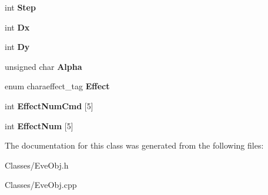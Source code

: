 \begin{DoxyCompactItemize}
\item 
int {\bfseries Step}\hypertarget{class_c_eve_obj_a80b342a74e5e71c12af93bd114950d59}{}\label{class_c_eve_obj_a80b342a74e5e71c12af93bd114950d59}

\item 
int {\bfseries Dx}\hypertarget{class_c_eve_obj_ac21fc500fe5980e297336a666fb54a7d}{}\label{class_c_eve_obj_ac21fc500fe5980e297336a666fb54a7d}

\item 
int {\bfseries Dy}\hypertarget{class_c_eve_obj_ae501f4202a2be1450d5559aacdc29cee}{}\label{class_c_eve_obj_ae501f4202a2be1450d5559aacdc29cee}

\item 
unsigned char {\bfseries Alpha}\hypertarget{class_c_eve_obj_af08374d0b794fba0e6483cde1d301e88}{}\label{class_c_eve_obj_af08374d0b794fba0e6483cde1d301e88}

\item 
enum charaeffect\+\_\+tag {\bfseries Effect}\hypertarget{class_c_eve_obj_a2d682f263c0bc45202d8aaa2e165e207}{}\label{class_c_eve_obj_a2d682f263c0bc45202d8aaa2e165e207}

\item 
int {\bfseries Effect\+Num\+Cmd} \mbox{[}5\mbox{]}\hypertarget{class_c_eve_obj_a888398852a120f02beccf16547e1ce2f}{}\label{class_c_eve_obj_a888398852a120f02beccf16547e1ce2f}

\item 
int {\bfseries Effect\+Num} \mbox{[}5\mbox{]}\hypertarget{class_c_eve_obj_afb29722b82571192f8b7462d0bbc2e27}{}\label{class_c_eve_obj_afb29722b82571192f8b7462d0bbc2e27}

\end{DoxyCompactItemize}


The documentation for this class was generated from the following files\+:\begin{DoxyCompactItemize}
\item 
Classes/Eve\+Obj.\+h\item 
Classes/Eve\+Obj.\+cpp\end{DoxyCompactItemize}
